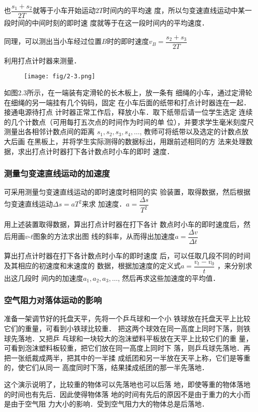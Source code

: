 也$\dfrac{s_1+s_2}{2T}$就等于小车开始运动$2T$时间内的平均速
度，所以匀变速直线运动中某一段时间的中间时刻的即时速
度就等于在这一段时间内的平均速度．

同理，可以测出当小车经过位置$B$时的即时速度$v_B=\dfrac{s_2+s_3}{2T}$

利用打点计时器来测量．
\begin{figure}[htp]
    \centering
\texttt{[image: fig/2-3.png]}
    \caption{}
\end{figure}
如图2.3所示，在一端装有定滑轮的长木板上，放一条有
细绳的小车，通过定滑轮在细绳的另一端挂有几个钩码，固定
在小车后面的纸带和打点计时器连在一起．接通电源待打点
计时器正常工作后，释放小车．取下纸带后请一位学生选定
连续的几个计数点（可用每打五次点的时间作为时间的单
位），并要求学生毫米刻度尺测量出各相邻计数点间的距离
$s_1,s_2,s_3,s_4,\ldots$, 教师可将纸带以及选定的计数点放大后画
在黑板上，并将学生实际测得的数据标出，用跟前述相同的方
法来处理数据，求出打点计时器打下各计数点时小车的即时
速度．

\subsubsection{测量匀变速直线运动的加速度}
可采用测量匀变速直线运动的即时速度时相同的实
验装置，取得数据，然后根据匀变速直线运动$\Delta s=aT^2$来求
加速度．$a=\dfrac{\Delta s}{T^2}$

用上述装置取得数据，算出打点计时器在打下各计
数点时小车的即时速度后，然后用画$v$-$t$图象的方法求出图
线的斜率，从而得出加速度$a=\dfrac{\Delta v}{\Delta t}$

算出打点计时器在打下各计数点时小车的即时速度
后，可以任取几段不同的时间及其相应的初速度和末速度的
数据，根据加速度的定义式$a=\dfrac{v_t-v_0}{t}$
，来分别求出这几段时
间内的加速度$a_1,a_2,a_3,\ldots$, 然后再求这些加速度的平均值．

\subsubsection{空气阻力对落体运动的影响}
准备一架调节好的托盘天平，先将一个乒乓球和一个小
铁球放在托盘天平上比较它们的重量，可看到小铁球比较重．
把这两个球效在同一高度上同时下落，则铁球先落地．又把乒
乓球和一块较大的泡沫塑料平板放在天平上比较它们的重
量，可看到泡沫塑料板较重，把它们放在同一高度上同时下
落，则乒乓球先落地．再把一张纸裁成两半，把其中的一半揉
成纸团和另一半放在天平上称，它们是等重的，使它们从同一
高度同时下落，结果揉成纸团的那一半先落地．

这个演示说明了，比较重的物体可以先落地也可以后落
地，即使等重的物体落地的时间也有先后．因此使得物体落
地的时间有先后的原因不是由于重力的大小而是由于空气阻
力大小的影响．受到空气阻力大的物体总是后落地．

